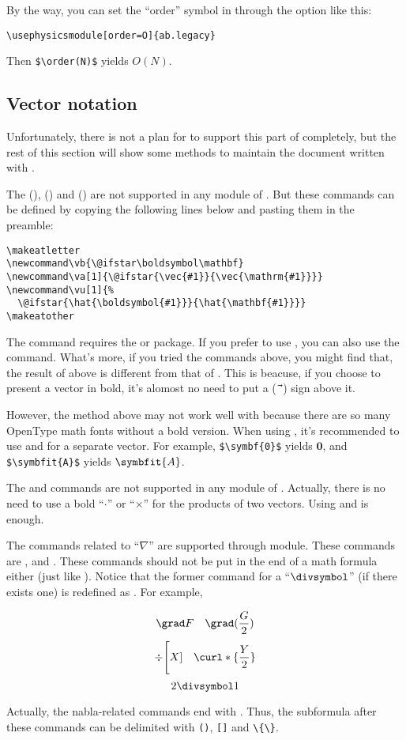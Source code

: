 \documentclass[11pt,letterpaper]{article}
\begin{document}
By the way, you can set the ``order'' symbol in  through
the  option like this:
\begin{Verbatim}
\usephysicsmodule[order=O]{ab.legacy}
\end{Verbatim}
Then \verb|$\order(N)$| yields $O(N)$.

\subsection{Vector notation}
Unfortunately, there is not a plan for  to support this part
of  completely, but the rest of this section will show some
methods to maintain the document written with .

The (\opt{*}), (\opt{*}) and (\opt{*}) are not supported
in any module of . But these commands can be defined by copying
the following lines below and pasting them in the preamble:
\begin{Verbatim}[fontsize=\small]
\makeatletter
\newcommand\vb{\@ifstar\boldsymbol\mathbf}
\newcommand\va[1]{\@ifstar{\vec{#1}}{\vec{\mathrm{#1}}}}
\newcommand\vu[1]{%
  \@ifstar{\hat{\boldsymbol{#1}}}{\hat{\mathbf{#1}}}}
\makeatother
\end{Verbatim}
The  command requires the  or  package.
If you prefer to use , you can also use the  command.
What's more, if you tried the commands above, you might find that,
the result of  above is different from that of .
This is beacuse, if you choose to present a vector in bold, it's alomost
no need to put a  ($\vec{\mskip9mu}$) sign above it.

However, the method above may not work well with 
because there are so many OpenType math fonts without a bold version.
When using , it's recommended to use  and
 for a separate vector. For example, \verb|$\symbf{0}$| yields
$\symbf{0}$, and \verb|$\symbfit{A}$| yields $\symbfit{A}$.

The  and  commands are not supported in any module
of . Actually, there is no need to use a bold ``$\cdot$''
or ``$\times$'' for the products of two vectors. Using  and
 is enough.

The commands related to ``$\nabla$'' are supported through 
module. These commands are ,  and . These commands
should not be put in the end of a math formula either (just like ).
Notice that the former  command for a ``$\divsymbol$'' (if there
exists one) is redefined as . For example,
\begin{example}
\[ \grad F      \quad
   \grad(\frac G2)     \]
\[ \div\Bigg[X]  \quad
    \curl*\{\frac Y2\} \]
\[ 2 \divsymbol 1      \]
\end{example}
Actually, the nabla-related commands end with . Thus, the subformula
after these commands can be delimited with \verb|()|, \verb|[]| and \verb|\{\}|.
\end{document}

